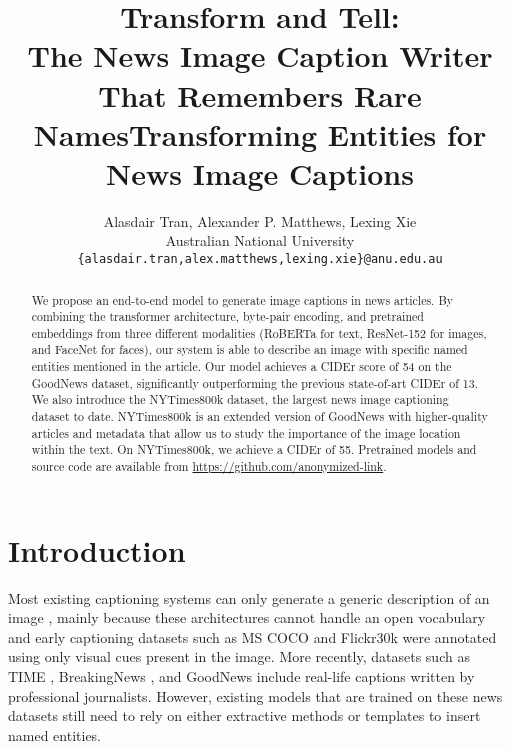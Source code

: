 \documentclass[10pt,twocolumn,letterpaper]{article}
\begin{document}
\title{Transform and Tell:\\The News Image Caption Writer That Remembers Rare Names}
\title{Transforming Entities for News Image Captions}

\author{Alasdair Tran, Alexander P. Matthews, Lexing Xie\\
Australian National University\\
{\tt\small \{alasdair.tran,alex.matthews,lexing.xie\}@anu.edu.au}
}

\maketitle

\begin{abstract}
   We propose an end-to-end model to generate image captions in news articles.
   By combining the transformer architecture, byte-pair encoding, and
   pretrained embeddings from three different modalities (RoBERTa for text,
   ResNet-152 for images, and FaceNet for faces), our system is able to
   describe an image with specific named entities mentioned in the article. Our
   model achieves a CIDEr score of 54 on the GoodNews dataset, significantly
   outperforming the previous state-of-art CIDEr of 13. We also introduce the
   NYTimes800k dataset, the largest news image captioning dataset to date.
   NYTimes800k is an extended version of GoodNews with higher-quality articles and
   metadata that allow us to study the importance of the image location within
   the text. On NYTimes800k, we achieve a CIDEr of 55. Pretrained models and
   source code are available from
   \href{https://github.com}{https://github.com/anonymized-link}.
\end{abstract}

\section{Introduction}

Most existing captioning systems can only generate a generic description of an
image \cite{Donahue2015LongTR, Vinyals2015ShowAT, Fang2015FromCT,
Karpathy2015DeepVA, Rennie2017SelfCriticalST, Lu2017KnowingWT,
Anderson2017BottomUpAT, Cornia2019ShowCT}, mainly because these architectures
cannot handle an open vocabulary and early captioning datasets such as MS COCO
\cite{Lin2014MicrosoftCC, Chen2015MicrosoftCC} and Flickr30k
\cite{Young2014FromID} were annotated using only visual cues present in the
image. More recently, datasets such as TIME \cite{Tariq2017ACE}, BreakingNews
\cite{Ramisa2016BreakingNewsAA}, and GoodNews \cite{Biten2019GoodNews} include
real-life captions written by professional journalists. However, existing
models that are trained on these news datasets still need to rely on either
extractive methods or templates to insert named entities.
\end{document}
